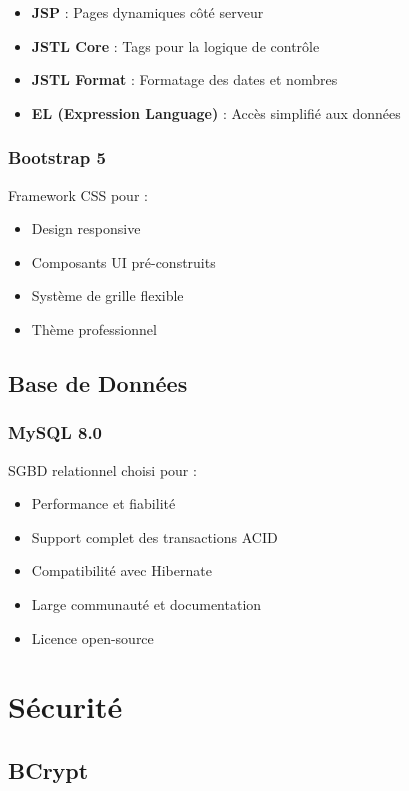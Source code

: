 \documentclass[12pt,a4paper,twoside]{report}
\begin{document}
\begin{itemize}
    \item \textbf{JSP} : Pages dynamiques côté serveur
    \item \textbf{JSTL Core} : Tags pour la logique de contrôle
    \item \textbf{JSTL Format} : Formatage des dates et nombres
    \item \textbf{EL (Expression Language)} : Accès simplifié aux données
\end{itemize}

\subsubsection{Bootstrap 5}

Framework CSS pour :
\begin{itemize}
    \item Design responsive
    \item Composants UI pré-construits
    \item Système de grille flexible
    \item Thème professionnel
\end{itemize}

\subsection{Base de Données}

\subsubsection{MySQL 8.0}

SGBD relationnel choisi pour :
\begin{itemize}
    \item Performance et fiabilité
    \item Support complet des transactions ACID
    \item Compatibilité avec Hibernate
    \item Large communauté et documentation
    \item Licence open-source
\end{itemize}

\section{Sécurité}

\subsection{BCrypt}
\end{document}
